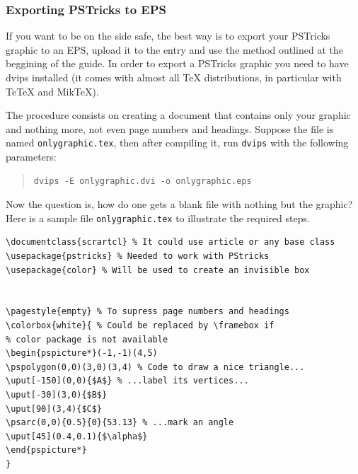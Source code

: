 \subsubsection{Exporting PSTricks to EPS}
If you want to be on the side safe, the best way is to export your PSTricks graphic to an EPS, upload it to the entry and use the method outlined at the beggining of the guide. In order to export a PSTricks graphic you need to have dvips installed (it comes with almost all TeX distributions, in particular with TeTeX and MikTeX).

The procedure consists on creating a document that contains only your graphic and nothing more, not even page numbers and headings. Suppose the file is named \verb+onlygraphic.tex+, then after compiling it, run \verb+dvips+ with the following parameters:
\begin{quote}
\begin{verbatim}
dvips -E onlygraphic.dvi -o onlygraphic.eps
\end{verbatim}
\end{quote}

Now the question is, how do one gets a blank file with nothing but the graphic?
Here is a sample file \verb+onlygraphic.tex+ to illustrate the required steps.

\begin{Verbatim}
\documentclass{scrartcl} % It could use article or any base class
\usepackage{pstricks} % Needed to work with PStricks
\usepackage{color} % Will be used to create an invisible box


\pagestyle{empty} % To supress page numbers and headings
\colorbox{white}{ % Could be replaced by \framebox if
% color package is not available
\begin{pspicture*}(-1,-1)(4,5)
\pspolygon(0,0)(3,0)(3,4) % Code to draw a nice triangle...
\uput[-150](0,0){$A$} % ...label its vertices...
\uput[-30](3,0){$B$}
\uput[90](3,4){$C$}
\psarc(0,0){0.5}{0}{53.13} % ...mark an angle
\uput[45](0.4,0.1){$\alpha$}
\end{pspicture*}
}

\end{Verbatim}

